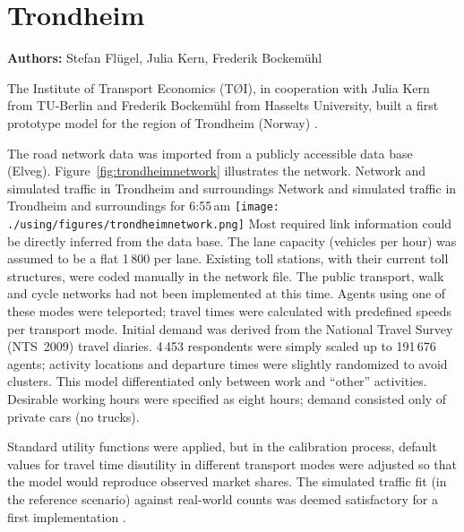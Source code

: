 \chapter{Trondheim}
\label{ch:trondheim}
\hfill \textbf{Authors:} Stefan Flügel, Julia Kern, Frederik Bockemühl


The Institute of Transport Economics (TØI), in cooperation with Julia Kern from TU-Berlin and Frederik Bockemühl from Hasselts University, built a first prototype model for the region of Trondheim (Norway) \citep[][]{FluegelKern_unpub_WTS_2014}.

The road network data was imported from a publicly accessible data base (Elveg). Figure~\ref{fig:trondheimnetwork} illustrates the network. 
%
\createfigure%
{Network and simulated traffic in Trondheim and surroundings}%
{Network and simulated traffic in Trondheim and surroundings for 6:55\,am \citep[source][]{FluegelEtAl_Samferdsel_2014}}%
{\label{fig:trondheimnetwork}}%
{\texttt{[image: ./using/figures/trondheimnetwork.png]}}%
{}
%
Most required link information could be directly inferred from the data base. The lane capacity (vehicles per hour) was assumed to be a flat 1\,800 per lane. Existing toll stations, with their current toll structures, were coded manually in the network file. The public transport, walk and cycle networks had not been implemented at this time. Agents using one of these modes were teleported; travel times were calculated with predefined speeds per transport mode. 
Initial demand was derived from the National Travel Survey (NTS~2009) travel diaries. 4\,453 respondents were simply scaled up to 191\,676 agents; activity locations and departure times were slightly randomized to avoid clusters. This model differentiated only between work and ``other'' activities. Desirable working hours were specified as eight hours; demand consisted only of private cars (no trucks). 

Standard utility functions were applied, but in the calibration process, default values for travel time disutility in different transport modes were adjusted so that the model would reproduce observed market shares. The simulated traffic fit (in the reference scenario) against real-world counts was deemed satisfactory for a first implementation \citep[][]{Bockemuehl_TechRep_UH_2014}. 

